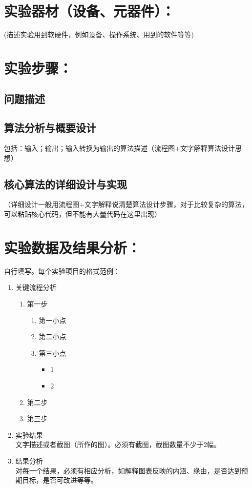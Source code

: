\documentclass[a4paper,11pt,UTF8,AutoFakeBold]{ctexart}
\begin{document}
\section{实验器材（设备、元器件）：}

(描述实验用到软硬件，例如设备、操作系统、用到的软件等等)\\

\section{实验步骤：}

\subsection{问题描述}
\subsection{算法分析与概要设计}
包括：输入；输出；输入转换为输出的算法描述（流程图+文字解释算法设计思想）
\subsection{核心算法的详细设计与实现}
（详细设计一般用流程图+文字解释说清楚算法设计步骤，对于比较复杂的算法，可以粘贴核心代码，但不能有大量代码在这里出现）


\section{实验数据及结果分析：}

自行填写。每个实验项目的格式范例：
\begin{enumerate}
  \item 关键流程分析
  \begin{enumerate}
      \item 第一步
      \begin{enumerate}
          \item 第一小点
          \item 第二小点
          \item 第三小点
          \begin{itemize}
              \item 1
              \item 2
          \end{itemize}
      \end{enumerate}
      \item 第二步
      \item 第三步
  \end{enumerate}
  \item 实验结果 \\ 文字描述或者截图（所作的图）。必须有截图，截图数量不少于2幅。
  \item 结果分析 \\ 对每一个结果，必须有相应分析，如解释图表反映的内涵、缘由，是否达到预期目标，是否可改进等等。\\
\end{enumerate}
\end{document}
